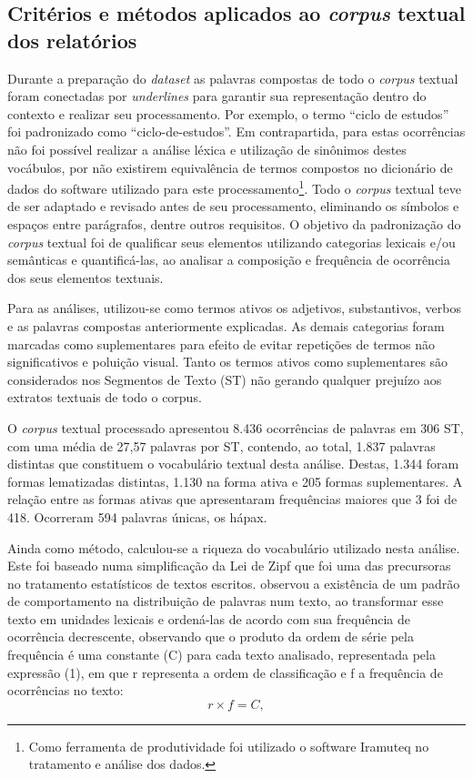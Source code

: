 \documentclass{textolivre}
\begin{document}
\subsection{Critérios e métodos aplicados ao \textit{corpus} textual dos relatórios}\label{sec-criterios}
Durante a preparação do \textit{dataset} as palavras compostas de todo o \textit{corpus} textual foram conectadas por \textit{underlines} para garantir sua representação dentro do contexto e realizar seu processamento. Por exemplo, o termo “ciclo de estudos” foi padronizado como “ciclo-de-estudos”. Em contrapartida, para estas ocorrências não foi possível realizar a análise léxica e utilização de sinônimos destes vocábulos, por não existirem equivalência de termos compostos no dicionário de dados do software utilizado para este processamento\footnote{Como ferramenta de produtividade foi utilizado o software Iramuteq no tratamento e análise dos dados.}. 
Todo o \textit{corpus} textual teve de ser adaptado e revisado antes de seu processamento, eliminando os símbolos e espaços entre parágrafos, dentre outros requisitos. O objetivo da padronização do \textit{corpus} textual foi de qualificar seus elementos utilizando categorias lexicais e/ou semânticas e quantificá-las, ao analisar a composição e frequência de ocorrência dos seus elementos textuais.

Para as análises, utilizou-se como termos ativos os adjetivos, substantivos, verbos e as palavras compostas anteriormente explicadas. As demais categorias foram marcadas como suplementares para efeito de evitar repetições de termos não significativos e poluição visual. Tanto os termos ativos como suplementares são considerados nos Segmentos de Texto (ST) não gerando qualquer prejuízo aos extratos textuais de todo o corpus.  

O \textit{corpus} textual processado apresentou 8.436 ocorrências de palavras em 306 ST, com uma média de 27,57 palavras por ST, contendo, ao total, 1.837 palavras distintas que constituem o vocabulário textual desta análise. Destas, 1.344 foram formas lematizadas distintas, 1.130 na forma ativa e 205 formas suplementares. A relação entre as formas ativas que apresentaram frequências maiores que 3 foi de 418. Ocorreram 594 palavras únicas, os hápax.

Ainda como método, calculou-se a riqueza do vocabulário utilizado nesta análise. Este foi baseado numa simplificação da Lei de Zipf \cite{booth1967,zipf1949} que foi uma das precursoras no tratamento estatísticos de textos escritos. \textcite{zipf1949} observou a existência de um padrão de comportamento na distribuição de palavras num texto, ao transformar esse texto em unidades lexicais e ordená-las de acordo com sua frequência de ocorrência decrescente, observando que o produto da ordem de série pela frequência é uma constante (C) para cada texto analisado, representada pela expressão (1), em que r representa a ordem de classificação e f a frequência de ocorrências no texto:
\begin{equation}
r \times f = C,
\end{equation}
\end{document}
